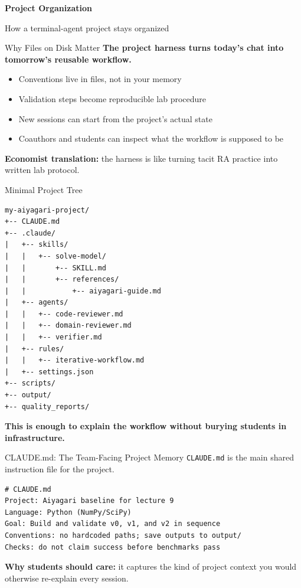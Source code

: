 \documentclass[10pt,english,aspectratio=169]{beamer}
\newcommand{\sectiondivider}[2]{%
\begin{frame}[plain,noframenumbering]
\begin{center}
\vfill
{\Large\textbf{#1}\par}
\vspace{0.35cm}
{\normalsize #2\par}
\vfill
\end{center}
\end{frame}
}
\begin{document}
\sectiondivider{Project Organization}{How a terminal-agent project stays organized}

\begin{frame}{Why Files on Disk Matter}
\textbf{The project harness turns today's chat into tomorrow's reusable workflow.}

\vspace{0.25cm}

\begin{itemize}
    \item Conventions live in files, not in your memory
    \item Validation steps become reproducible lab procedure
    \item New sessions can start from the project's actual state
    \item Coauthors and students can inspect what the workflow is supposed to be
\end{itemize}

\vspace{0.25cm}

\textbf{Economist translation:} the harness is like turning tacit RA practice into written lab protocol.
\end{frame}

\begin{frame}[fragile]{Minimal Project Tree}
\begin{lstlisting}[style=pythonstyle,language={},basicstyle=\ttfamily\tiny]
my-aiyagari-project/
+-- CLAUDE.md
+-- .claude/
|   +-- skills/
|   |   +-- solve-model/
|   |       +-- SKILL.md
|   |       +-- references/
|   |           +-- aiyagari-guide.md
|   +-- agents/
|   |   +-- code-reviewer.md
|   |   +-- domain-reviewer.md
|   |   +-- verifier.md
|   +-- rules/
|   |   +-- iterative-workflow.md
|   +-- settings.json
+-- scripts/
+-- output/
+-- quality_reports/
\end{lstlisting}

\textbf{This is enough to explain the workflow without burying students in infrastructure.}
\end{frame}

\begin{frame}[fragile]{CLAUDE.md: The Team-Facing Project Memory}
\texttt{CLAUDE.md} is the main shared instruction file for the project.

\vspace{0.2cm}

\begin{lstlisting}[style=pythonstyle,language={},basicstyle=\ttfamily\tiny,numbers=none]
# CLAUDE.md
Project: Aiyagari baseline for lecture 9
Language: Python (NumPy/SciPy)
Goal: Build and validate v0, v1, and v2 in sequence
Conventions: no hardcoded paths; save outputs to output/
Checks: do not claim success before benchmarks pass
\end{lstlisting}

\vspace{0.2cm}

\textbf{Why students should care:} it captures the kind of project context you would otherwise re-explain every session.
\end{frame}
\end{document}
